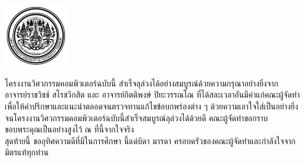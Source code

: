\documentclass[14pt,oneside,openright,a4paper]{cpe-thai-project}
\begin{document}
\pdfstringdefDisableCommands{%
\let\MakeUppercase\relax
}

\begin{center}
  \includegraphics[width=2.8cm]{logo02.jpg}
\end{center}
\vspace*{-1cm}

\maketitlepage
\makesignaturepage 







\preface
โครงงานวิศวกรรมคอมพิวเตอร์ฉบับนี้ สำเร็จลุล่วงได้อย่างสมบูรณ์ด้วยความกรุณาอย่างยิ่งจาก อาจารย์ราชวิชช์ สโรชวิกสิต และ 
อาจารย์กิตติพงษ์ ปิยะวรรณโณ ที่ได้สละเวลาอันมีค่าแก่คณะผู้จัดทำ เพื่อให้คำปรึกษาและแนะนำตลอดจนตรวจทานแก้ไขข้อบกพร่องต่าง ๆ ด้วยความเอาใจใส่เป็นอย่างยิ่ง 
จนโครงงานวิศวกรรมคอมพิวเตอร์ฉบับนี้สำเร็จสมบูรณ์ลุล่วงได้ด้วยดี คณะผู้จัดทำขอกราบขอบพระคุณเป็นอย่างสูงไว้ ณ ที่นี้จากใจจริง 
\\
สุดท้ายนี้ ขออุทิศความดีที่มีในการศึกษา นี้แด่บิดา มารดา ครอบครัวของคณะผู้จัดทำและกำลังใจจากมิตรแท้ทุกท่าน

\tableofcontents                    
\listoftables
\listoffigures                      
\end{document}
